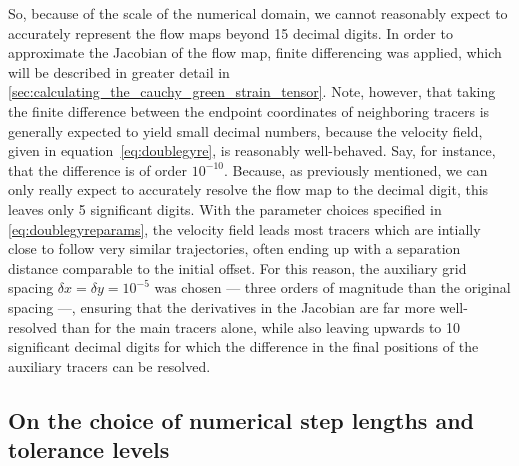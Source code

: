 So, because of the scale of the numerical domain, we cannot reasonably expect
to accurately represent the flow maps beyond 15 decimal digits. In order to
approximate the Jacobian of the flow map, finite differencing was applied,
which will be described in greater detail in
\cref{sec:calculating_the_cauchy_green_strain_tensor}. Note, however, that
taking the finite difference between the endpoint coordinates of neighboring
tracers is generally expected to yield small decimal numbers, because the
velocity field, given in equation~\eqref{eq:doublegyre}, is reasonably
well-behaved. Say, for instance, that the difference is of order $10^{-10}$.
Because, as previously mentioned, we can only really expect to accurately
resolve the flow map to the  decimal digit, this leaves only 5
significant digits. With the parameter choices specified in
\eqref{eq:doublegyreparams}, the velocity field leads most tracers which
are intially close to follow very similar trajectories, often ending up
with a separation distance comparable to the initial offset. For this reason,
the auxiliary grid spacing $\delta{x}=\delta{y}=10^{-5}$ was chosen --- three
orders of magnitude than the original spacing ---, ensuring that the derivatives
in the Jacobian are far more well-resolved than for the main tracers alone,
while also leaving upwards to 10 significant decimal digits for which the
difference in the final positions of the auxiliary tracers can be resolved.

%
\subsection{On the choice of numerical step lengths and tolerance levels}
\label{sub:on_the_choice_of_numerical_step_lengths_and_tolerance_levels}

